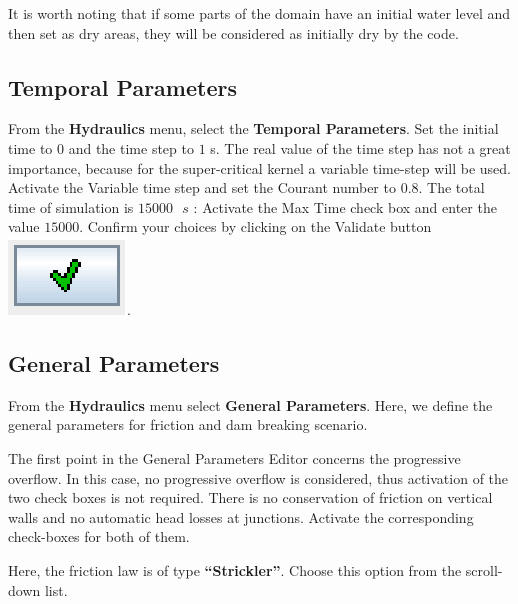 \documentclass[a4paper,12pt]{article}
\begin{document}
It is worth noting that if some parts of the domain have an initial water level and then set as dry
areas, they will be considered as initially dry by the code.


\subsection{Temporal Parameters}

\hspace{0.5cm} From the \textbf{Hydraulics} menu, select the \textbf{Temporal Parameters}. Set the initial time to $0$ and the time step
to $1$ s. The real value of the time step has not a great importance, because for the super-critical kernel a variable time-step will
be used. Activate the Variable time step and set the Courant number
to $0.8$. The total time of simulation is $15000\mbox{ }s$ : Activate the Max Time check box and enter the value
$15000$. Confirm your choices by clicking on the Validate button \includegraphics[scale=0.6]{valid}.


\subsection{General Parameters  
 
}

\hspace{0.5cm} From the \textbf{Hydraulics} menu select \textbf{General Parameters}. Here, we define the general parameters for friction and dam breaking scenario.

\vspace{0.5cm}

The first point in the General Parameters Editor concerns the progressive
overflow. In this case, no progressive overflow is considered,
thus activation of the two check boxes is not required. There is no conservation
of friction on vertical walls and no automatic head losses at junctions.
Activate the corresponding check-boxes for both of them. 

\vspace{0.5cm}

Here, the friction law is  of type \textbf{{}``Strickler''}. Choose this option from the scroll-down list.
\end{document}
